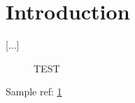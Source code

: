 \section{Introduction}
\label{se:intro}

[...]

\begin{figure}
TEST
\label{this is a caption}
\label{fi:myfigure}
\end{figure}

Sample ref: \ref{fi:myfigure}
  